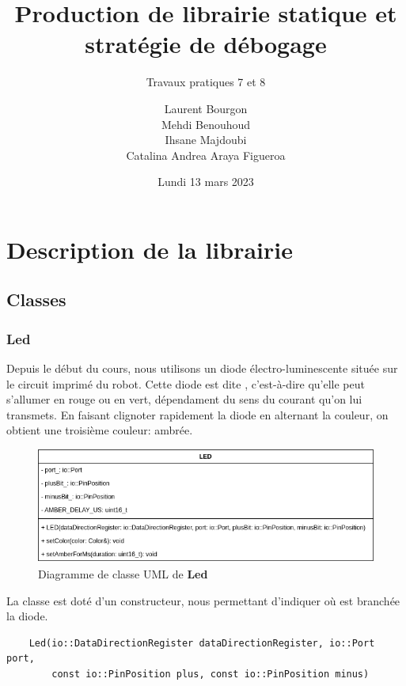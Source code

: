 \documentclass[12pt]{scrartcl}
\author{Laurent Bourgon \\Mehdi Benouhoud \\Ihsane Majdoubi \\Catalina Andrea Araya Figueroa}
\subtitle{Travaux pratiques 7 et 8}
\title{Production de librairie statique et stratégie de débogage}
\date{Lundi 13 mars 2023}
\begin{document}
\maketitle



\newpage

\section{Description de la librairie}

\subsection{Classes}
\subsubsection{Led}
Depuis le début du cours, nous utilisons un diode électro-luminescente située
sur le circuit imprimé du robot. Cette diode est dite  , c'est-à-dire
qu'elle peut s'allumer en rouge ou en vert, dépendament du sens du courant qu'on
lui transmets. En faisant clignoter rapidement la diode en alternant la couleur,
on obtient une troisième couleur: ambrée.

\begin{figure}[h]
    \centering
    \includegraphics[scale=0.60]{LED_diagramme_classe}
    \caption{Diagramme de classe UML de \textbf{Led}}
\end{figure}

La classe est doté d'un constructeur, nous permettant d'indiquer où est branchée
la diode.
\begin{verbatim}
    Led(io::DataDirectionRegister dataDirectionRegister, io::Port port,
        const io::PinPosition plus, const io::PinPosition minus)
\end{verbatim}
\end{document}
